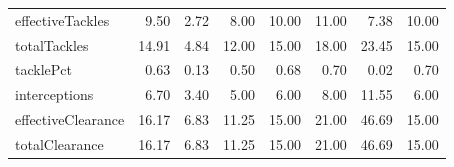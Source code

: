 \begin{table}[H]
\begin{tabular}{lrrrrrrr}
effectiveTackles & 9.50 & 2.72 & 8.00 & 10.00 & 11.00 & 7.38 & 10.00 \\
totalTackles & 14.91 & 4.84 & 12.00 & 15.00 & 18.00 & 23.45 & 15.00 \\
tacklePct & 0.63 & 0.13 & 0.50 & 0.68 & 0.70 & 0.02 & 0.70 \\
interceptions & 6.70 & 3.40 & 5.00 & 6.00 & 8.00 & 11.55 & 6.00 \\
effectiveClearance & 16.17 & 6.83 & 11.25 & 15.00 & 21.00 & 46.69 & 15.00 \\
totalClearance & 16.17 & 6.83 & 11.25 & 15.00 & 21.00 & 46.69 & 15.00 \\
\hline
\end{tabular}
\end{table}
